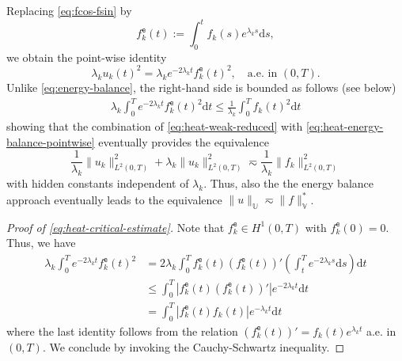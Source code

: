 \documentclass{amsart}
\theoremstyle{plain}
\theoremstyle{remark}
\numberwithin{equation}{section}
\numberwithin{theorem}{section}
\newcommand{\trial}{\mathbb{U}}
\newcommand{\data}{\mathbb{V}^*}
\newcommand{\fexp}{f_{k}^{\mathtt{e}}}
\newcommand{\dt}{\mathrm{d}t}
\begin{document}
Replacing \eqref{eq:fcos-fsin} by
\begin{equation*}
	\label{eq:f-exp}
	\fexp(t) := \int_0^t f_k(s)e^{\lambda_k s}\mathrm{d}s,
\end{equation*}
we obtain the point-wise identity
\begin{equation}
	\label{eq:heat-energy-balance-pointwise}
\lambda_k u_k(t)^2 
= 
\lambda_k e^{-2\lambda_k t}\fexp(t)^2, \quad \text{a.e. in $(0,T)$.}
\end{equation}
Unlike \eqref{eq:energy-balance}, the right-hand side is bounded as follows (see below)
\begin{align}
\label{eq:heat-critical-estimate}
	\lambda_k\int_0^Te^{-2\lambda_k t} \fexp(t)^2\dt \le 
	\frac{1}{\lambda_k}\int_0^Tf_k(t)^2\dt
\end{align}
showing that the combination of \eqref{eq:heat-weak-reduced} with \eqref{eq:heat-energy-balance-pointwise} eventually provides the equivalence
\begin{equation*}
\frac{1}{\lambda_k} \|u_k\|^2_{L^2(0,T)} + \lambda_k \|u_k\|^2_{L^2(0,T)} \eqsim
\frac{1}{\lambda_k} \|f_k\|^2_{L^2(0,T)}	
\end{equation*}
with hidden constants independent of $\lambda_k$. Thus, also the the energy balance approach eventually leads to the equivalence $\|u\|_\trial \eqsim \|f\|_\data$. 

\begin{proof}[Proof of \eqref{eq:heat-critical-estimate}]
Note that $\fexp \in H^1(0,T)$ with $\fexp(0) = 0$. Thus, we have
\begin{equation*}
\begin{split}
\lambda_k\int_0^Te^{-2\lambda_k t} \fexp(t)^2 
&= 
2 \lambda_k \int_0^T \fexp(t) (\fexp(t))'\left( \int_t^T e^{-2\lambda_k s} \mathrm{d}s\right)\dt \\
&\leq
\int_0^T |\fexp(t) (\fexp(t))'| e^{-2\lambda_k t}\dt\\
&=
\int_0^T |\fexp(t) f_k(t)| e^{-\lambda_k t}\dt
\end{split}
\end{equation*}
where the last identity follows from the relation $(\fexp(t))' = f_k(t) e^{\lambda_k t}$ a.e. in $(0,T)$. We conclude by invoking the Cauchy-Schwartz inequality.\end{proof}
\end{document}
